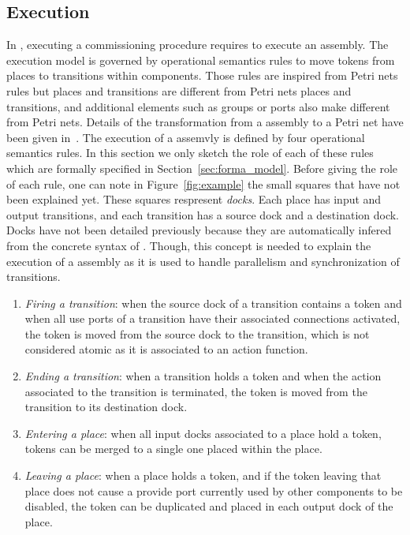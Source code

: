 \subsection{Execution}

In \mad, executing a commissioning procedure requires to execute an
assembly. 
The \mad execution model is governed by operational semantics rules to
move tokens from places to transitions within components. Those rules
are inspired from Petri nets rules but \mad places and transitions
are different from Petri nets places and transitions, and additional
elements such as groups or ports also make \mad different from
Petri nets. Details of the transformation from a \mad assembly to a
Petri net have been given in~\cite{}. The execution of a \mad assemvly
is defined by four operational semantics rules. In this section we only
sketch the role of each of these rules which are formally specified in
Section~\ref{sec:forma_model}. Before giving the role of each rule,
one can note in Figure~\ref{fig:example} the small squares that
have not been explained yet. These squares respresent \emph{docks}. Each
place has input and output transitions, and each transition has a
source dock and a destination dock. Docks have not been detailed
previously because they are automatically infered from the concrete
syntax of \mad. Though, this concept is needed to explain the
execution of a \mad assembly as it is used to handle parallelism and
synchronization of transitions.
%
\begin{enumerate}
\item \emph{Firing a transition}: when the source dock of a transition
  contains a token and when all use ports of a transition have their
  associated connections activated, the token is moved from the source
  dock to the transition, which is not considered atomic as it is
  associated to an action function.
\item \emph{Ending a transition}: when a transition holds a token and
  when the action associated to the transition is terminated, the
  token is moved from the transition to its destination dock.
\item \emph{Entering a place}: when all input docks associated to a
  place hold a token, tokens can be merged to a single one placed
  within the place.
\item \emph{Leaving a place}: when a place holds a token, and if the
  token leaving that place does not cause a provide port currently
  used by other components to be disabled,
  the token can be duplicated and placed in each output dock of the
  place.
\end{enumerate}

